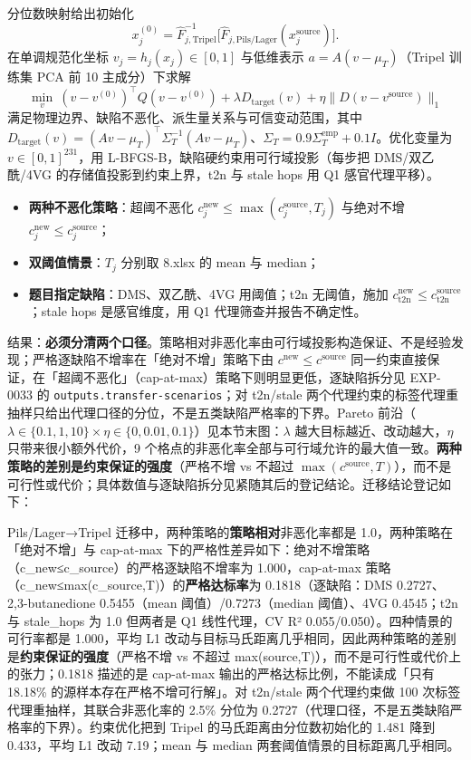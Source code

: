 \documentclass[
  11pt,
]{article}
\providecommand{\tightlist}{%
  \setlength{\itemsep}{0pt}\setlength{\parskip}{0pt}}
\begin{document}
分位数映射给出初始化 \[
x_j^{(0)}=\widehat F_{j,\mathrm{Tripel}}^{-1}\big[\widehat F_{j,\mathrm{Pils/Lager}}(x_j^{\mathrm{source}})\big].
\] 在单调规范化坐标 \(v_j=h_j(x_j)\in[0,1]\) 与低维表示
\(a=A(v-\mu_T)\)（Tripel 训练集 PCA 前 10 主成分）下求解 \[
\min_v\ (v-v^{(0)})^\top Q(v-v^{(0)})+\lambda D_{\mathrm{target}}(v)+\eta\|D(v-v^{\mathrm{source}})\|_1
\] 满足物理边界、缺陷不恶化、派生量关系与可信变动范围，其中
\(D_{\mathrm{target}}(v)=(Av-\mu_T)^\top\Sigma_T^{-1}(Av-\mu_T)\)、\(\Sigma_T=0.9\Sigma_T^{\mathrm{emp}}+0.1I\)。优化变量为
\(v\in[0,1]^{231}\)，用 L-BFGS-B，缺陷硬约束用可行域投影（每步把
DMS/双乙酰/4VG 的存储值投影到约束上界，t2n 与 stale hops 用 Q1
感官代理平移）。

\begin{itemize}
\tightlist
\item
  \textbf{两种不恶化策略}：超阈不恶化
  \(c_j^{\mathrm{new}}\le\max(c_j^{\mathrm{source}},T_j)\) 与绝对不增
  \(c_j^{\mathrm{new}}\le c_j^{\mathrm{source}}\)；
\item
  \textbf{双阈值情景}：\(T_j\) 分别取 8.xlsx 的 mean 与 median；
\item
  \textbf{题目指定缺陷}：DMS、双乙酰、4VG 用阈值；t2n 无阈值，施加
  \(c_{\mathrm{t2n}}^{\mathrm{new}}\le c_{\mathrm{t2n}}^{\mathrm{source}}\)；stale
  hops 是感官维度，用 Q1 代理筛查并报告不确定性。
\end{itemize}

结果：\textbf{必须分清两个口径}。策略相对非恶化率由可行域投影构造保证、不是经验发现；严格逐缺陷不增率在「绝对不增」策略下由
\(c^{\mathrm{new}}\le c^{\mathrm{source}}\)
同一约束直接保证，在「超阈不恶化」（cap-at-max）策略下则明显更低，逐缺陷拆分见
EXP-0033 的 \texttt{outputs.transfer-scenarios}；对 t2n/stale
两个代理约束的标签代理重抽样只给出代理口径的分位，不是五类缺陷严格率的下界。Pareto
前沿（\(\lambda\in\{0.1,1,10\}\times\eta\in\{0,0.01,0.1\}\)）见本节末图：\(\lambda\)
越大目标越近、改动越大，\(\eta\) 只带来很小额外代价，9
个格点的非恶化率全部与可行域允许的最大值一致。\textbf{两种策略的差别是约束保证的强度}（严格不增
vs 不超过
\(\max(c^{\mathrm{source}},T)\)），而不是可行性或代价；具体数值与逐缺陷拆分见紧随其后的登记结论。迁移结论登记如下：

Pils/Lager→Tripel 迁移中，两种策略的\textbf{策略相对}非恶化率都是
1.0，两种策略在「绝对不增」与 cap-at-max
下的严格性差异如下：绝对不增策略（c\_new≤c\_source）的严格逐缺陷不增率为
1.000，cap-at-max 策略（c\_new≤max(c\_source,T)）的\textbf{严格达标率}为
0.1818（逐缺陷：DMS 0.2727、2,3-butanedione 0.5455（mean
阈值）/0.7273（median 阈值）、4VG 0.4545；t2n 与 stale\_hops 为 1.0
但两者是 Q1 线性代理，CV R² 0.055/0.050）。四种情景的可行率都是
1.000，平均 L1
改动与目标马氏距离几乎相同，因此两种策略的差别是\textbf{约束保证的强度}（严格不增
vs 不超过 max(source,T)），而不是可行性或代价上的张力；0.1818 描述的是
cap-at-max 输出的严格达标比例，不能读成「只有 18.18\%
的源样本存在严格不增可行解」。对 t2n/stale 两个代理约束做 100
次标签代理重抽样，其联合非恶化率的 2.5\% 分位为
0.2727（代理口径，不是五类缺陷严格率的下界）。约束优化把到 Tripel
的马氏距离由分位数初始化的 1.481 降到 0.433，平均 L1 改动 7.19；mean 与
median 两套阈值情景的目标距离几乎相同。
\end{document}
